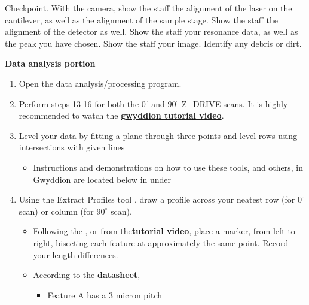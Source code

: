 \documentclass{../lab}
\begin{document}
\begin{itemize}
    Checkpoint. With the camera, show the staff the alignment of the laser on the cantilever, as well as the alignment of the sample stage. Show the staff the alignment of the detector as well. Show the staff your resonance data, as well as the peak you have chosen. Show the staff your image. Identify any debris or dirt.
\end{itemize}
\textbf{Data analysis portion}

\begin{enumerate}
    \item Open the  data analysis/processing program.

    \item Perform steps 13-16 for both the $0^\circ$ and $90^\circ$ Z\_DRIVE scans. It is highly recommended to watch the \href{http://experimentationlab.berkeley.edu/sites/default/files/AFMImages/gwyddion1.mp4.mp4}{\textbf{gwyddion tutorial video}}.

    \item Level your data by fitting a plane through three points   and level rows using intersections with given lines

    \begin{itemize}
        \item Instructions and demonstrations on how to use these tools, and others, in Gwyddion are located below in  under

    \end{itemize}

    \item \textbf{​}Using the Extract Profiles tool , draw a profile across your neatest row (for $0^\circ$ scan) or column (for $90^\circ$ scan).

    \begin{itemize}
        \item Following the \textbf{}, or from the\href{http://experimentationlab.berkeley.edu/sites/default/files/AFMImages/gwyddion1.mp4.mp4}{\textbf{tutorial video}}, place a marker, from left to right, bisecting each feature at approximately the same point.  Record your length differences.

        \item According to the \href{http://experimentationlab.berkeley.edu/sites/default/files/AFMImages/Reference-\%20sample-SHS-01\_3\_datasheet.pdf}{\textbf{datasheet}},

        \begin{itemize}
            \item Feature A has a 3 micron pitch


\end{itemize}
\end{itemize}
\end{enumerate}
\end{document}
